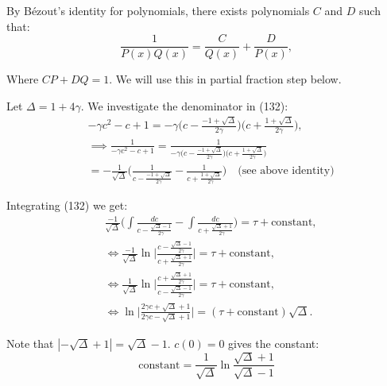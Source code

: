 \documentclass[12pt]{article}
\begin{document}
By B\'{e}zout's identity for polynomials, there exists polynomials $C$
and $D$ such that:
\begin{equation}
\frac{1}{P(x) Q(x)} = \frac{C}{Q(x)} + \frac{D}{P(x)},
\end{equation}

Where $CP+DQ = 1$. We will use this in partial fraction step below.

Let $\Delta=1 + 4\gamma$. We investigate the denominator in (132):
\begin{align}
&-\gamma c^2 - c + 1 = - \gamma
                        \Big(c - \frac{-1 + \sqrt{\Delta}}{2 \gamma}\Big)
                        \Big(c + \frac{ 1 + \sqrt{\Delta}}{2 \gamma}\Big), \\
&\implies \frac{1}{- \gamma c^2 - c + 1} = \frac{1}
                        {- \gamma
                        \Big(c - \frac{-1 + \sqrt{\Delta}}{2 \gamma}\Big)
                        \Big(c + \frac{ 1 + \sqrt{\Delta}}{2 \gamma}\Big)} \\
&= - \frac{1}{\sqrt{\Delta}}
   \Bigg(\frac{1}{c - \frac{-1 + \sqrt{\Delta}}{2 \gamma}} -
        \frac{1}{c + \frac{1 + \sqrt{\Delta}}{2 \gamma}} \Bigg)
   \quad \text{(see above identity)}
\end{align}

Integrating (132) we get:
\begin{align}
&\frac{-1}{\sqrt{\Delta}}
\Big( \int \frac{dc}{c - \frac{\sqrt{\Delta} - 1}{2 \gamma}} -
      \int \frac{dc}{c + \frac{\sqrt{\Delta} + 1}{2 \gamma}}
\Big) = \tau + \text{constant}, \\
&\iff \frac{-1}{\sqrt{\Delta}}
      \ln \bigg|\frac{c - \frac{\sqrt{\Delta}-1}{2\gamma}}
                     {c + \frac{\sqrt{\Delta}+1}{2\gamma}} \bigg|
 = \tau + \text{constant}, \\
&\iff \frac{1}{\sqrt{\Delta}}
      \ln \bigg|\frac{c + \frac{\sqrt{\Delta}+1}{2\gamma}}
                     {c - \frac{\sqrt{\Delta}-1}{2\gamma}} \bigg|
 = \tau + \text{constant}, \\
&\iff  \ln \bigg|\frac{2\gamma c + \sqrt{\Delta}+1}
                      {2\gamma c - \sqrt{\Delta}+1} \bigg|
 = (\tau + \text{constant}) \sqrt{\Delta}.
\end{align}

Note that $|-\sqrt{\Delta}+1| = \sqrt{\Delta} - 1$. $c(0)=0$ gives the constant:
\begin{equation}
\text{constant} =
\frac{1}{\sqrt{\Delta}} \ln \frac{\sqrt{\Delta}+1}{{\sqrt{\Delta}-1}}
\end{equation}
\end{document}
